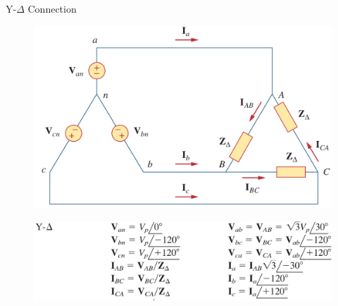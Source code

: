\documentclass{beamer}
\begin{document}
\begin{frame}{Y-$\Delta$ Connection}
    \begin{figure}[H]
        \centering
        \includegraphics[scale = 0.35]{C12/yd.png}
        \label{fig:enter-label}
    \end{figure}
    \begin{figure}[H]
        \centering
        \includegraphics[scale = 0.35]{C12/yd1.png}
        \label{fig:enter-label}
    \end{figure}
\end{frame}
\end{document}
